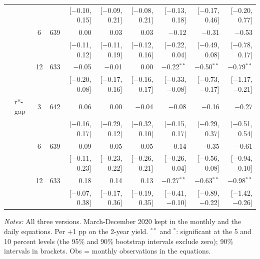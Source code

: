 \begin{longtable}{llcrrrrrrr}
 & & & & {\scriptsize [$-$0.10, 0.15]} & {\scriptsize [$-$0.09, 0.21]} & {\scriptsize [$-$0.08, 0.21]} & {\scriptsize [$-$0.13, 0.18]} & {\scriptsize [$-$0.17, 0.46]} & {\scriptsize [$-$0.20, 0.77]}\\
 &  & 6 & 639 & 0.00 & 0.03 & 0.03 & $-$0.12 & $-$0.31 & $-$0.53\\
 & & & & {\scriptsize [$-$0.11, 0.12]} & {\scriptsize [$-$0.11, 0.19]} & {\scriptsize [$-$0.12, 0.16]} & {\scriptsize [$-$0.22, 0.04]} & {\scriptsize [$-$0.49, 0.08]} & {\scriptsize [$-$0.78, 0.17]}\\
 &  & 12 & 633 & $-$0.05 & $-$0.01 & 0.00 & $-$0.22$^{**}$ & $-$0.50$^{**}$ & $-$0.79$^{**}$\\
 & & & & {\scriptsize [$-$0.20, 0.08]} & {\scriptsize [$-$0.17, 0.16]} & {\scriptsize [$-$0.16, 0.17]} & {\scriptsize [$-$0.33, $-$0.08]} & {\scriptsize [$-$0.73, $-$0.17]} & {\scriptsize [$-$1.17, $-$0.21]}\\
 & r*-gap & 3 & 642 & 0.06 & 0.00 & $-$0.04 & $-$0.08 & $-$0.16 & $-$0.27\\
 & & & & {\scriptsize [$-$0.16, 0.17]} & {\scriptsize [$-$0.29, 0.12]} & {\scriptsize [$-$0.32, 0.10]} & {\scriptsize [$-$0.15, 0.17]} & {\scriptsize [$-$0.29, 0.37]} & {\scriptsize [$-$0.51, 0.54]}\\
 &  & 6 & 639 & 0.09 & 0.05 & 0.05 & $-$0.14 & $-$0.35 & $-$0.61\\
 & & & & {\scriptsize [$-$0.11, 0.23]} & {\scriptsize [$-$0.23, 0.22]} & {\scriptsize [$-$0.26, 0.21]} & {\scriptsize [$-$0.26, 0.04]} & {\scriptsize [$-$0.56, 0.08]} & {\scriptsize [$-$0.94, 0.10]}\\
 &  & 12 & 633 & 0.18 & 0.14 & 0.13 & $-$0.27$^{**}$ & $-$0.63$^{**}$ & $-$0.98$^{**}$\\
 & & & & {\scriptsize [$-$0.07, 0.38]} & {\scriptsize [$-$0.17, 0.36]} & {\scriptsize [$-$0.19, 0.35]} & {\scriptsize [$-$0.41, $-$0.10]} & {\scriptsize [$-$0.89, $-$0.22]} & {\scriptsize [$-$1.42, $-$0.26]}\\
\end{longtable}
\begin{flushleft}\footnotesize\textit{Notes:} All three versions. March-December 2020 kept in the monthly and the daily equations. Per +1 pp on the 2-year yield. $^{**}$ and $^{*}$: significant at the 5 and 10 percent levels (the 95\% and 90\% bootstrap intervals exclude zero); 90\% intervals in brackets. Obs = monthly observations in the equations.\end{flushleft}
\endgroup
